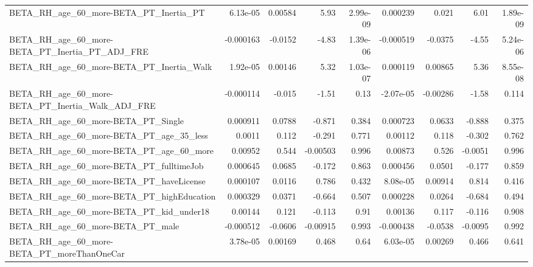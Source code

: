 \begin{tabular}{lrrrrrrrr}
BETA\_RH\_age\_60\_more-BETA\_PT\_Inertia\_PT             &    6.13e-05 &      0.00584 &     5.93 & 2.99e-09 &   0.000239 &       0.021 &         6.01 &      1.89e-09 \\
BETA\_RH\_age\_60\_more-BETA\_PT\_Inertia\_PT\_ADJ\_FRE     &   -0.000163 &      -0.0152 &    -4.83 & 1.39e-06 &  -0.000519 &     -0.0375 &        -4.55 &      5.24e-06 \\
BETA\_RH\_age\_60\_more-BETA\_PT\_Inertia\_Walk           &    1.92e-05 &      0.00146 &     5.32 & 1.03e-07 &   0.000119 &     0.00865 &         5.36 &      8.55e-08 \\
BETA\_RH\_age\_60\_more-BETA\_PT\_Inertia\_Walk\_ADJ\_FRE   &   -0.000114 &       -0.015 &    -1.51 &     0.13 &  -2.07e-05 &    -0.00286 &        -1.58 &         0.114 \\
BETA\_RH\_age\_60\_more-BETA\_PT\_Single                 &    0.000911 &       0.0788 &   -0.871 &    0.384 &   0.000723 &      0.0633 &       -0.888 &         0.375 \\
BETA\_RH\_age\_60\_more-BETA\_PT\_age\_35\_less            &      0.0011 &        0.112 &   -0.291 &    0.771 &    0.00112 &       0.118 &       -0.302 &         0.762 \\
BETA\_RH\_age\_60\_more-BETA\_PT\_age\_60\_more            &     0.00952 &        0.544 & -0.00503 &    0.996 &    0.00873 &       0.526 &      -0.0051 &         0.996 \\
BETA\_RH\_age\_60\_more-BETA\_PT\_fulltimeJob            &    0.000645 &       0.0685 &   -0.172 &    0.863 &   0.000456 &      0.0501 &       -0.177 &         0.859 \\
BETA\_RH\_age\_60\_more-BETA\_PT\_haveLicense            &    0.000107 &       0.0116 &    0.786 &    0.432 &   8.08e-05 &     0.00914 &        0.814 &         0.416 \\
BETA\_RH\_age\_60\_more-BETA\_PT\_highEducation          &    0.000329 &       0.0371 &   -0.664 &    0.507 &   0.000228 &      0.0264 &       -0.684 &         0.494 \\
BETA\_RH\_age\_60\_more-BETA\_PT\_kid\_under18            &     0.00144 &        0.121 &   -0.113 &     0.91 &    0.00136 &       0.117 &       -0.116 &         0.908 \\
BETA\_RH\_age\_60\_more-BETA\_PT\_male                   &   -0.000512 &      -0.0606 & -0.00915 &    0.993 &  -0.000438 &     -0.0538 &      -0.0095 &         0.992 \\
BETA\_RH\_age\_60\_more-BETA\_PT\_moreThanOneCar         &    3.78e-05 &      0.00169 &    0.468 &     0.64 &   6.03e-05 &     0.00269 &        0.466 &         0.641 \\

\end{tabular}
